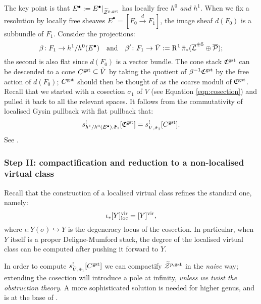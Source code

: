 The key point is that $E^{\bullet}:=E^{\bullet}\rvert_{\widetilde{\mathcal Z}^{p,\rm{gst}}}$ has locally free $h^0$ \emph{and} $h^1$. When we fix a resolution by locally free sheaves $E^{\bullet}=[F_0\xrightarrow{d} F_1]$, the image sheaf $d(F_0)$ is a subbundle of $F_1$. Consider the projections:
\[
 \beta\colon F_1\rightarrow h^1/h^0(E^{\bullet}) \quad \text{and} \quad \beta'\colon F_1\rightarrow \tilde{V}:=\operatorname{R}^1\bar{\pi}_*(\overline{\mathcal{L}}^{\oplus 5}\oplus\overline{\mathcal P});
\]
the second is also flat since $d(F_0)$ is a vector bundle. The cone stack $\mathfrak C^{\rm{gst}}$ can be descended to a cone $C^{\rm{gst}}\subseteq \tilde{V}$ by taking the quotient of $\beta^{-1}\mathfrak C^{\rm{gst}}$ by the free action of $d(F_0)$; $C^{\rm{gst}}$ should then be thought of as the coarse moduli of $\mathfrak C^{\rm{gst}}$. Recall that we started with a cosection $\sigma_1$ of $V$ (see Equation \eqref{eqn:cosection}) and pulled it back to all the relevant spaces. 
It follows from the commutativity of localised Gysin pullback with flat pullback that:
\[
 s^!_{h^1/h^0(E^{\bullet}),\tilde\sigma_1}[\mathfrak C^{\rm{gst}}]= s^!_{\tilde V,\tilde\sigma_1}[C^{\rm{gst}}].
\]
See \cite[Proposition 6.3]{CL-pfields}.



\subsubsection{Step II: compactification and reduction to a non-localised virtual class}
Recall that the construction of a localised virtual class refines the standard one, namely:
\[\iota_*[Y]^{\mathrm{vir}}_{\mathrm{loc}}=[Y]^{\mathrm{vir}},\]
where $\iota\colon Y(\sigma)\hookrightarrow Y$ is the degeneracy locus of the cosection. In particular, when $Y$ itself is a proper Deligne-Mumford stack, the degree of the localised virtual class can be computed after pushing it forward to $Y$.

In order to compute $s^!_{\tilde V,\tilde\sigma_1}[C^{\rm{gst}}]$ we can compactify $\widetilde{\mathcal Z}^{p,\rm{gst}}$ in the \emph{naive} way; extending the cosection will introduce a pole at infinity, \emph{unless we twist the obstruction theory}. A more sophisticated solution is needed for higher genus, and is at the base of \cite{CJRS}.

